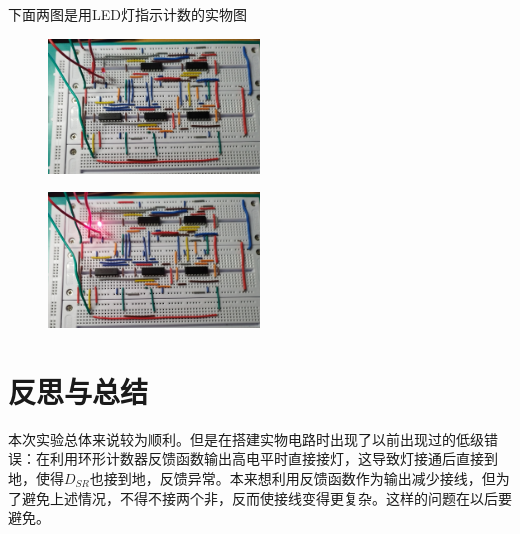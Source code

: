\documentclass{ctexart}
\begin{document}
下面两图是用LED灯指示计数的实物图
\begin{figure}[H]
    \centering
    \includegraphics[width=0.5\textwidth]{不亮.jpg}
\end{figure}
\begin{figure}[H]
    \centering
    \includegraphics[width=0.5\textwidth]{点亮.jpg}
\end{figure}
\section{反思与总结}
本次实验总体来说较为顺利。但是在搭建实物电路时出现了以前出现过的低级错误：在利用环形计数器反馈函数输出高电平时直接接灯，这导致灯接通后直接到地，使得$D_{SR}$也接到地，反馈异常。本来想利用反馈函数作为输出减少接线，但为了避免上述情况，不得不接两个非，反而使接线变得更复杂。这样的问题在以后要避免。
\end{document}
